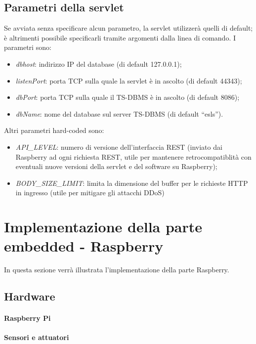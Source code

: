 \subsection{Parametri della servlet}
Se avviata senza specificare alcun parametro, la servlet utilizzerà quelli di default; è altrimenti possibile specificarli tramite argomenti dalla linea di comando. I parametri sono:
\begin{itemize}
 \item \textit{dbhost}: indirizzo IP del database (di default 127.0.0.1);
 \item \textit{listenPort}: porta TCP sulla quale la servlet è in ascolto (di default 44343);
 \item \textit{dbPort}: porta TCP sulla quale il TS-DBMS è in ascolto (di default 8086);
 \item \textit{dbName}: nome del database sul server TS-DBMS (di default ``esls'').
\end{itemize}
Altri parametri hard-coded sono:
\begin{itemize}
 \item \textit{API\_LEVEL}: numero di versione dell'interfaccia REST (inviato dai Raspberry ad ogni richiesta REST, utile per mantenere retrocompatiblità con eventuali nuove versioni della servlet e del software su Raspberry);
 \item \textit{BODY\_SIZE\_LIMIT}: limita la dimensione del buffer per le richieste HTTP in ingresso (utile per mitigare gli attacchi DDoS)
\end{itemize}


\section{Implementazione della parte embedded - Raspberry}
In questa sezione verrà illustrata l'implementazione della parte Raspberry.

\subsection{Hardware}
\paragraph{Raspberry Pi}
\paragraph{Sensori e attuatori}

